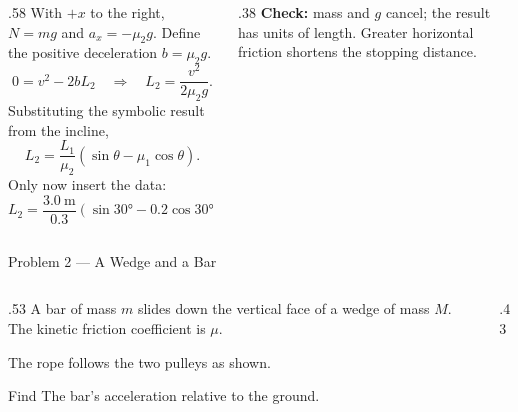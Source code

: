 \begin{solutionframe}
  \begin{columns}[T,onlytextwidth]
    \begin{column}{.58\textwidth}
      With \(+x\) to the right, \(N=mg\) and
      \(a_x=-\mu_2g\). Define the positive deceleration \(b=\mu_2g\).
      \[
        0=v^2-2bL_2
        \quad\Longrightarrow\quad
        L_2=\frac{v^2}{2\mu_2g}.
      \]
      Substituting the symbolic result from the incline,
      \[
        L_2=\frac{L_1}{\mu_2}
          (\sin\theta-\mu_1\cos\theta).
      \]
      Only now insert the data:
      \[
        L_2=\frac{\SI{3.0}{\metre}}{0.3}
          (\sin\ang{30}-0.2\cos\ang{30}).
      \]
    \end{column}
    \begin{column}{.38\textwidth}
      \medskip
      \textbf{Check:} mass and \(g\) cancel; the result has units of length.
      Greater horizontal friction shortens the stopping distance.
    \end{column}
  \end{columns}
\end{solutionframe}

\begin{frame}{Problem 2 — A Wedge and a Bar}
  \par
  \small
  \begin{columns}[T,onlytextwidth]
    \begin{column}{.53\textwidth}
      A bar of mass \(m\) slides down the vertical face of a wedge of mass
      \(M\). The kinetic friction coefficient is \(\mu\).

      \medskip
      The rope follows the two pulleys as shown.
      \begin{block}{Find}
        The bar's acceleration relative to the ground.
      \end{block}

    \end{column}
    \begin{column}{.43\textwidth}
    \end{column}
  \end{columns}
\end{frame}


